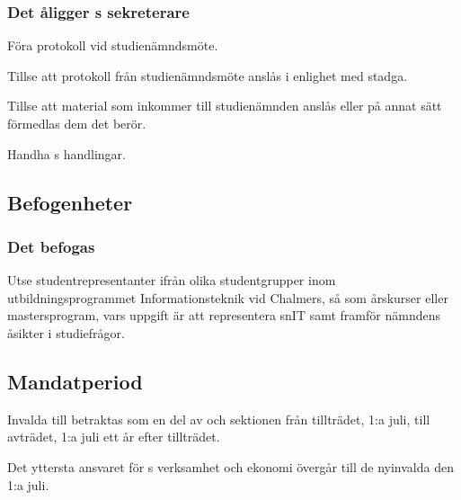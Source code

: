 \subsubsection{Det åligger \SNIT{}s sekreterare}
\begin{att}
	\item Föra protokoll vid studienämndsmöte.
	\item Tillse att protokoll från studienämndsmöte anslås i enlighet med stadga.
	\item Tillse att material som inkommer till studienämnden anslås eller på annat sätt förmedlas dem det berör.
	\item Handha \SNIT{}s handlingar.
\end{att}

\subsection{Befogenheter}

\subsubsection{Det befogas \SNIT}
\begin{att}
	\item Utse studentrepresentanter ifrån olika studentgrupper inom utbildningsprogrammet Informationsteknik vid Chalmers, så som årskurser eller mastersprogram, vars uppgift är att representera snIT samt framför nämndens åsikter i studiefrågor.
\end{att}

\subsection{Mandatperiod}
Invalda till \SNIT{} betraktas som en del av \SNIT{} och sektionen från tillträdet, 1:a juli, till avträdet, 1:a juli ett år efter tillträdet.

Det yttersta ansvaret för \SNIT{}s verksamhet och ekonomi övergår till de nyinvalda den 1:a juli.

